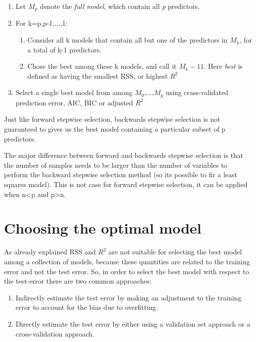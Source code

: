 \begin{enumerate}
	\item Let $M_p$ denote the \textit{full model}, which contain all \textit{p} predictors.
	
	\item For k=p,p-1,...,1:
	\begin{enumerate}
		\item Consider all k models that contain all but one of the predictors in $M_k$, for a total of k-1 predictors. 
		
		\item Chose the best among these k models, and call it $M_k-11$. Here \textit{best} is defined as having the smallest RSS, or highest $R^2$
	\end{enumerate}
	\item Select a single best model from among $M_0$,...,$M_p$ using crass-validated prediction error, AIC, BIC or adjusted $R^2$
\end{enumerate}

Just like forward stepwise selection, backwards stepwise selection is not guaranteed to gives us the best model containing a particular subset of p predictors. 

The major difference between forward and backwards stepwise selection is that the number of samples needs to be larger than the number of variables to perform the backward stepwise selection method (so its possible to fir a least squares model). This is not case for forward stepwise selection, it can be applied when n<p and p>n. 

\section{Choosing the optimal model}
As already explained RSS and $R^2$ are not suitable for selecting the best model among a collection of models, because these quantities are related to the training error and not the test error. 
So, in order to select the best model with respect to the test-error there are two common approaches:

\begin{enumerate}
	\item Indirectly estimate the test error by making an adjustment to the training error to account for the bias due to overfitting.
	
	\item Directly estimate the test error by either using a validation set approach or a cross-validation approach. 

\end{enumerate}

